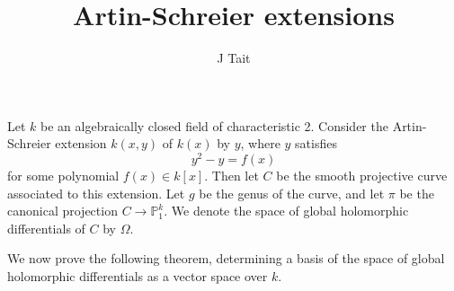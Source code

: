 \documentclass[11pt]{article} %
\title{Artin-Schreier extensions}
\author{J Tait}
\theoremstyle{remark}\newtheorem*{rem}{Remark}
\begin{document}
\maketitle
Let $k$ be an algebraically closed field of characteristic 2.
Consider the Artin-Schreier extension $k(x,y)$ of $k(x)$ by $y$, where $y$ satisfies
\begin{equation}\label{1}
  y^2 - y = f(x)
\end{equation}
for some polynomial $f(x)\in k[x]$.
Then let $C$ be the smooth projective curve associated to this extension.
Let $g$ be the genus of the curve, and let $\pi$ be the canonical projection $C\rightarrow \mathbb P_1^k$.
We denote the space of global holomorphic differentials of $C$ by $\Omega$.

We now prove the following theorem, determining a basis of the space of global holomorphic differentials as a vector space over $k$.\\
\end{document}

